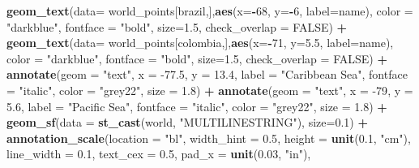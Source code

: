 \documentclass[12pt,twoside]{reedthesis}
\newenvironment{Shaded}{\begin{snugshade}}{\end{snugshade}}
\newcommand{\DataTypeTok}[1]{\textcolor[rgb]{0.13,0.29,0.53}{#1}}
\newcommand{\DecValTok}[1]{\textcolor[rgb]{0.00,0.00,0.81}{#1}}
\newcommand{\FloatTok}[1]{\textcolor[rgb]{0.00,0.00,0.81}{#1}}
\newcommand{\KeywordTok}[1]{\textcolor[rgb]{0.13,0.29,0.53}{\textbf{#1}}}
\newcommand{\NormalTok}[1]{#1}
\newcommand{\OperatorTok}[1]{\textcolor[rgb]{0.81,0.36,0.00}{\textbf{#1}}}
\newcommand{\OtherTok}[1]{\textcolor[rgb]{0.56,0.35,0.01}{#1}}
\newcommand{\StringTok}[1]{\textcolor[rgb]{0.31,0.60,0.02}{#1}}
\begin{document}
\begin{Shaded}
\begin{Highlighting}[]
\StringTok{  }\KeywordTok{geom_text}\NormalTok{(}\DataTypeTok{data=}\NormalTok{ world_points[brazil,],}\KeywordTok{aes}\NormalTok{(}\DataTypeTok{x=}\OperatorTok{-}\DecValTok{68}\NormalTok{, }\DataTypeTok{y=}\OperatorTok{-}\DecValTok{6}\NormalTok{, }\DataTypeTok{label=}\NormalTok{name), }\DataTypeTok{color =} \StringTok{"darkblue"}\NormalTok{, }\DataTypeTok{fontface =} \StringTok{"bold"}\NormalTok{, }\DataTypeTok{size=}\FloatTok{1.5}\NormalTok{, }\DataTypeTok{check_overlap =} \OtherTok{FALSE}\NormalTok{) }\OperatorTok{+}
\StringTok{  }\KeywordTok{geom_text}\NormalTok{(}\DataTypeTok{data=}\NormalTok{ world_points[colombia,],}\KeywordTok{aes}\NormalTok{(}\DataTypeTok{x=}\OperatorTok{-}\DecValTok{71}\NormalTok{, }\DataTypeTok{y=}\FloatTok{5.5}\NormalTok{, }\DataTypeTok{label=}\NormalTok{name), }\DataTypeTok{color =} \StringTok{"darkblue"}\NormalTok{, }\DataTypeTok{fontface =} \StringTok{"bold"}\NormalTok{, }\DataTypeTok{size=}\FloatTok{1.5}\NormalTok{, }\DataTypeTok{check_overlap =} \OtherTok{FALSE}\NormalTok{) }\OperatorTok{+}
\StringTok{  }\KeywordTok{annotate}\NormalTok{(}\DataTypeTok{geom =} \StringTok{"text"}\NormalTok{, }\DataTypeTok{x =} \FloatTok{-77.5}\NormalTok{, }\DataTypeTok{y =} \FloatTok{13.4}\NormalTok{, }\DataTypeTok{label =} \StringTok{"Caribbean Sea"}\NormalTok{, }\DataTypeTok{fontface =} \StringTok{"italic"}\NormalTok{, }\DataTypeTok{color =} \StringTok{"grey22"}\NormalTok{, }\DataTypeTok{size =} \FloatTok{1.8}\NormalTok{) }\OperatorTok{+}\StringTok{ }
\StringTok{  }\KeywordTok{annotate}\NormalTok{(}\DataTypeTok{geom =} \StringTok{"text"}\NormalTok{, }\DataTypeTok{x =} \DecValTok{-79}\NormalTok{, }\DataTypeTok{y =} \FloatTok{5.6}\NormalTok{, }\DataTypeTok{label =} \StringTok{"Pacific Sea"}\NormalTok{, }\DataTypeTok{fontface =} \StringTok{"italic"}\NormalTok{, }\DataTypeTok{color =} \StringTok{"grey22"}\NormalTok{, }\DataTypeTok{size =} \FloatTok{1.8}\NormalTok{) }\OperatorTok{+}
\StringTok{  }\KeywordTok{geom_sf}\NormalTok{(}\DataTypeTok{data =} \KeywordTok{st_cast}\NormalTok{(world, }\StringTok{"MULTILINESTRING"}\NormalTok{), }\DataTypeTok{size=}\FloatTok{0.1}\NormalTok{) }\OperatorTok{+}
\StringTok{  }\KeywordTok{annotation_scale}\NormalTok{(}\DataTypeTok{location =} \StringTok{"bl"}\NormalTok{, }\DataTypeTok{width_hint =} \FloatTok{0.5}\NormalTok{, }\DataTypeTok{height =} \KeywordTok{unit}\NormalTok{(}\FloatTok{0.1}\NormalTok{, }\StringTok{"cm"}\NormalTok{), }\DataTypeTok{line_width =} \FloatTok{0.1}\NormalTok{, }\DataTypeTok{text_cex =} \FloatTok{0.5}\NormalTok{, }\DataTypeTok{pad_x =} \KeywordTok{unit}\NormalTok{(}\FloatTok{0.03}\NormalTok{, }\StringTok{"in"}\NormalTok{), }

\end{Highlighting}
\end{Shaded}
\end{document}
